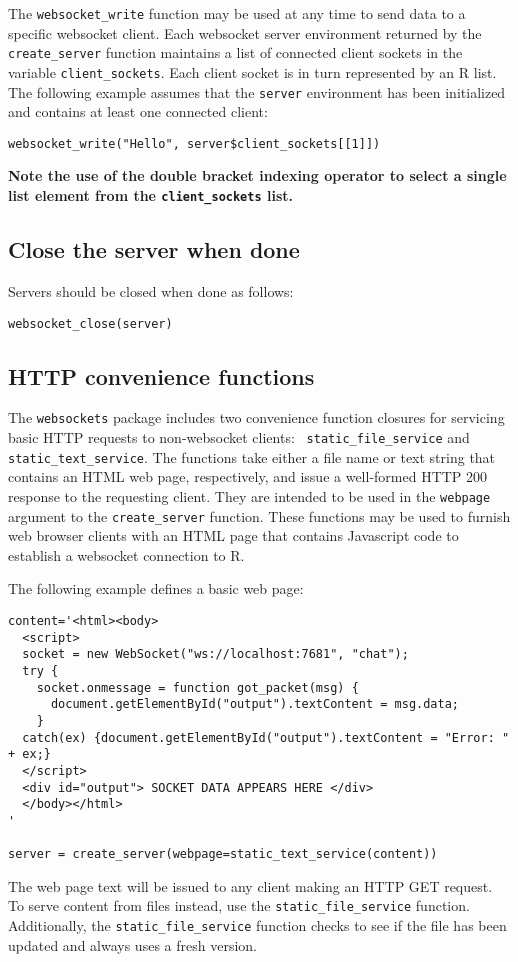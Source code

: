 \documentclass[12pt]{article}
\begin{document}
The {\tt websocket\_write} function may be used at any time to send data
to a specific websocket client. Each websocket server environment returned
by the {\tt create\_server} function maintains a list of connected client
sockets in the variable {\tt client\_sockets}. Each client socket is in
turn represented by an R list. The following example assumes that the
{\tt server} environment has been initialized and contains at least one
connected client:
\begin{lstlisting}
websocket_write("Hello", server$client_sockets[[1]])
\end{lstlisting}
{\bf Note the use of the double bracket indexing operator to select a single
list element from the {\tt client\_sockets} list.}

\subsection{Close the server when done}
Servers should be closed when done as follows:
\begin{lstlisting}
websocket_close(server)
\end{lstlisting}

\subsection{HTTP convenience functions}

The {\tt websockets} package includes two convenience function closures for
servicing basic HTTP requests to non-websocket clients: {\tt
static\_file\_service} and {\tt static\_text\_service}. The functions take
either a file name or text string that contains an HTML web page, respectively,
and issue a well-formed HTTP 200 response to the requesting client. They are
intended to be used in the {\tt webpage} argument to the {\tt create\_server}
function.  These functions may be used to furnish web browser clients with
an HTML page that contains Javascript code to establish a websocket connection
to R.

The following example defines a basic web page:
\begin{lstlisting}
content='<html><body>
  <script>
  socket = new WebSocket("ws://localhost:7681", "chat");
  try {
    socket.onmessage = function got_packet(msg) {
      document.getElementById("output").textContent = msg.data;
    } 
  catch(ex) {document.getElementById("output").textContent = "Error: " + ex;}
  </script>
  <div id="output"> SOCKET DATA APPEARS HERE </div>
  </body></html>
'

server = create_server(webpage=static_text_service(content))
\end{lstlisting}
The web page text will be issued to any client making an HTTP GET request.  To
serve content from files instead, use the {\tt static\_file\_service} function.
Additionally, the {\tt static\_file\_service} function checks to see if the
file has been updated and always uses a fresh version.
\end{document}
